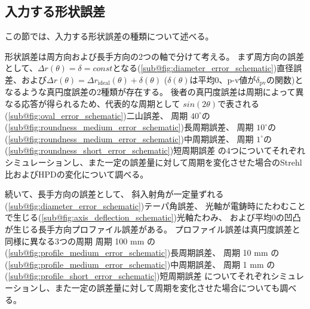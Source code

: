 \subsection{入力する形状誤差}
\label{chap2_error_input_types}

この節では、入力する形状誤差の種類について述べる。

形状誤差は周方向および長手方向の2つの軸で分けて考える。
まず周方向の誤差として、$\Delta r(\theta)=\delta=const$となる(\ref{sub@fig:diameter_error_schematic})直径誤差、および$\Delta r(\theta)=\Delta r_{\mathrm{ideal}}(\theta) + \delta(\theta)$ ($\delta(\theta)$は平均$0$、p-v値が$\delta_{\mathrm{pv}}$の関数)となるような真円度誤差の2種類が存在する。
後者の真円度誤差は周期によって異なる応答が得られるため、代表的な周期として
$sin(2\theta)$で表される(\ref{sub@fig:oval_error_schematic})二山誤差、
周期 $40^\circ$の(\ref{sub@fig:roundness_medium_error_schematic})長周期誤差、
周期 $10^\circ$の(\ref{sub@fig:roundness_medium_error_schematic})中周期誤差、
周期 $1^\circ$の(\ref{sub@fig:roundness_short_error_schematic})短周期誤差
の4つについてそれぞれシミュレーションし、また一定の誤差量に対して周期を変化させた場合のStrehl比およびHPDの変化について調べる。

続いて、長手方向の誤差として、
斜入射角が一定量ずれる(\ref{sub@fig:diameter_error_schematic})テーパ角誤差、
光軸が電鋳時にたわむことで生じる(\ref{sub@fig:axis_deflection_schematic})光軸たわみ、
および平均$0$の凹凸が生じる長手方向プロファイル誤差がある。
プロファイル誤差は真円度誤差と同様に異なる3つの周期
周期 100 mm の(\ref{sub@fig:profile_medium_error_schematic})長周期誤差、
周期 10 mm の(\ref{sub@fig:profile_medium_error_schematic})中周期誤差、
周期 1 mm の(\ref{sub@fig:profile_short_error_schematic})短周期誤差
についてそれぞれシミュレーションし、また一定の誤差量に対して周期を変化させた場合についても調べる。



